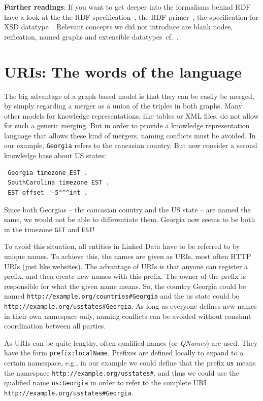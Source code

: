 \documentclass{IOS-Book-Article}
\begin{document}
\medskip

\textbf{Further readings}:
If you want to get deeper into the formalisms behind RDF have a look at the the RDF specification~\cite{rdf-spec}, 
the RDF primer~\cite{rdf-primer}, 
the specification for XSD datatype~\cite{xsd-part2}.
Relevant concepts we did not introduce are blank nodes, reification, named graphs and extensible datatypes~cf.~\cite{ namedgraphs,rdf-primer}.

\section{URIs: The words of the language}
\label{uri}

The big advantage of a graph-based model is that they can be easily be merged, by simply regarding a merger as a union of the triples in both graphs.
Many other models for knowledge representations, like tables or XML files, do not allow for such a generic merging.
But in order to provide a knowledge representation language that allows these kind of mergers, naming conflicts must be avoided.
In our example, \texttt{Georgia} refers to the caucasian country.
But now consider a second knowledge base about US states:

\begin{verbatim}
 Georgia timezone EST .
 SouthCarolina timezone EST .
 EST offset "-5"^^int .
\end{verbatim}

Since both Georgias -- the caucasian country and the US state -- are named the same, we would not be able to differentiate them.
Georgia now seems to be both in the timezone \texttt{GET} and \texttt{EST}!

To avoid this situation, all entities in Linked Data have to be referred to by unique names.
To achieve this, the names are given as URIs, most often HTTP URIs (just like websites).
The advantage of URIs is that anyone can register a prefix, and then create new names with this prefix.
The owner of the prefix is responsible for what the given name means.
So, the country Georgia could be named \texttt{http://example.org/countries\#Georgia} and the us state could be \texttt{http://example.org/usstates\#Georgia}.
As long as everyone defines new names in their own namespace only, naming conflicts can be avoided without constant coordination between all parties.

As URIs can be quite lengthy, often qualified names (or \textit{QNames}) are used.
They have the form \texttt{prefix:localName}.
Prefixes are defined locally to expand to a certain namespace, e.g., in our example we could define that the prefix \texttt{us} means the namespace \texttt{http://example.org/usstates\#}, and thus we could use the qualified name \texttt{us:Georgia} in order to refer to the complete URI \texttt{http://example.org/usstates\#Georgia}.
\end{document}
